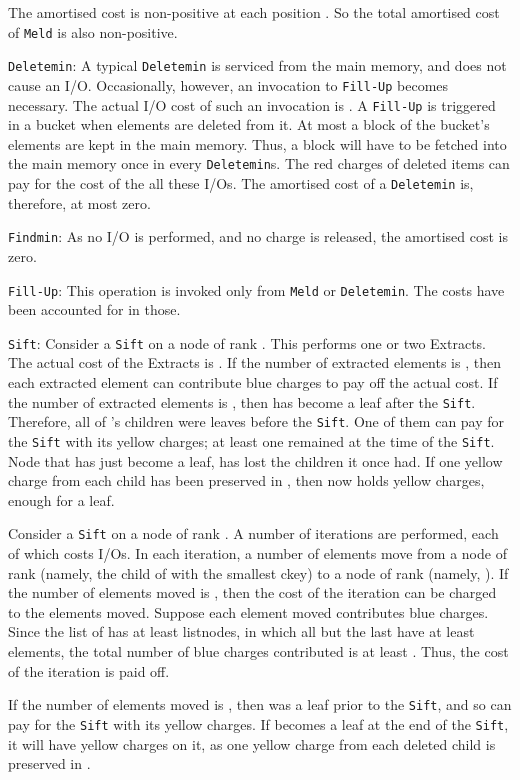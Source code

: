 The amortised cost is non-positive at each position . 
So the total amortised cost of {\tt Meld} is also non-positive.


{\tt Deletemin}:
A typical {\tt Deletemin} is serviced from the main memory, and does
not cause an I/O. Occasionally, however, an invocation
to {\tt Fill-Up} becomes necessary. The actual I/O cost
of such an invocation is . A {\tt Fill-Up} is triggered
in a bucket when  elements are deleted from it.
At most a block of the bucket's elements are kept in the main memory.
Thus, a block will have to be fetched into the main memory once in every
 {\tt Deletemin}s. 
The red charges of deleted items can pay for the cost of the all these I/Os.  
The amortised cost of a {\tt Deletemin} is, therefore, at most zero.

{\tt Findmin}: As no I/O is performed, and no charge is released,
the amortised cost is zero.

{\tt Fill-Up}:
This operation is invoked only from {\tt Meld} or {\tt Deletemin}.
The costs have been accounted for in those.

{\tt Sift}:
Consider a {\tt Sift} on a node  of rank .
This performs one or two Extracts. The actual cost of the Extracts is .
If the number of extracted elements is ,
	then each extracted element can contribute  blue charges 
	to pay off the actual cost.
If the number of extracted elements is , then
 has become a leaf after the {\tt Sift}.
Therefore, all of 's children were leaves before the {\tt Sift}. 
One of them can pay for the {\tt Sift} with its  yellow charges;
	at least one remained at the time of the {\tt Sift}.
Node  that has just become a leaf, has lost the  children 
	it once had. 
If one yellow charge from each child has been preserved in , then
	 now holds  yellow charges, enough for a leaf.

Consider a {\tt Sift} on a node  of rank .
A number of iterations are performed, each of which costs  I/Os.
In each iteration, a number of elements move from a node of rank 
 (namely, the child  of  with the smallest ckey) to a node of rank 
(namely, ). If the number of elements moved is , then
the cost of the iteration can be charged to the elements moved. 
Suppose each element moved contributes  blue charges.
Since the list of  has at least  listnodes,
in which all but the last have at least  elements, the total number of
blue charges contributed is at least 
. 
Thus, the cost of the
	iteration is paid off.

If the number of elements moved is , then  was a leaf prior
to the {\tt Sift}, and so can pay for the {\tt Sift} with its  yellow charges.
If  becomes a leaf at the end of the {\tt Sift}, it will have  yellow charges 
on it, as one yellow charge from each deleted child is preserved in .

